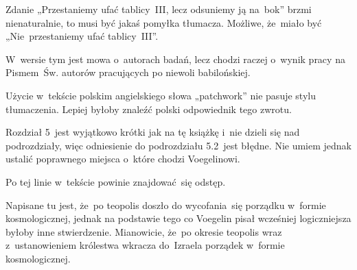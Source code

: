 \documentclass[a4paper,11pt]{article}
\begin{document}
\vspace{\spaceFour}


\start {} Zdanie „Przestaniemy ufać tablicy~III, lecz
odsuniemy ją na~bok” brzmi nienaturalnie, to musi być jakaś pomyłka
tłumacza. Możliwe, że~miało być „Nie~przestaniemy ufać tablicy~III”.

\vspace{\spaceFour}


\start {} W~wersie tym jest mowa o~autorach badań, lecz
chodzi raczej o~wynik pracy na Pismem~Św. autorów pracujących po
niewoli babilońskiej.

\vspace{\spaceFour}


\start {} Użycie w~tekście polskim angielskiego słowa
„patchwork” nie pasuje stylu tłumaczenia. Lepiej byłoby znaleźć
polski odpowiednik tego zwrotu.

\vspace{\spaceFour}


\start {} Rozdział 5~jest wyjątkowo krótki jak na tę
książkę i~nie dzieli się nad podrozdziały, więc odniesienie do
podrozdziału 5.2~jest błędne. Nie umiem jednak ustalić poprawnego
miejsca o~które chodzi Voegelinowi.

\vspace{\spaceFour}


\start {} Po tej linie w~tekście powinie znajdować~się
odstęp.

\vspace{\spaceFour}


\start {} Napisane tu jest, że~po teopolis doszło do
wycofania~się porządku w~formie kosmologicznej, jednak na podstawie
tego co Voegelin pisał wcześniej logiczniejsza byłoby inne
stwierdzenie. Mianowicie, że~po okresie teopolis wraz z~ustanowieniem
królestwa wkracza do~Izraela porządek w~formie kosmologicznej.





\end{document}

